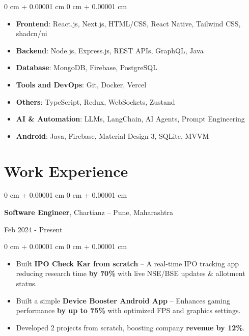 \documentclass[10pt, letterpaper]{article}
\newenvironment{highlights}{
    \begin{itemize}[
        topsep=0.10 cm,
        parsep=0.10 cm,
        partopsep=0pt,
        itemsep=0pt,
        leftmargin=0 cm + 10pt,
        labelindent=0pt
    ]
}{
    \end{itemize}
} %
\newenvironment{highlightsforbulletentries}{
    \begin{itemize}[
        topsep=0.10 cm,
        parsep=0.10 cm,
        partopsep=0pt,
        itemsep=0pt,
        leftmargin=10pt,
        labelindent=0pt
    ]
}{
    \end{itemize}
} %
\newenvironment{onecolentry}{
    \begin{adjustwidth}{
        0 cm + 0.00001 cm
    }{
        0 cm + 0.00001 cm
    }
}{
    \end{adjustwidth}
} %
\newenvironment{twocolentry}[2][]{
    \onecolentry
    \def\secondColumn{#2}
    \setcolumnwidth{\fill, 4.5 cm}
    \begin{paracol}{2}
}{
    \switchcolumn \raggedleft \secondColumn
    \end{paracol}
    \endonecolentry
} %
\begin{document}
    \begin{onecolentry}
        \begin{highlightsforbulletentries}

            \item \textbf{Frontend}: React.js, Next.js, HTML/CSS, React Native, Tailwind CSS, shadcn/ui
            \item \textbf{Backend}: Node.js, Express.js, REST APIs, GraphQL, Java
            \item \textbf{Database}: MongoDB, Firebase, PostgreSQL
            \item \textbf{Tools and DevOps}: Git, Docker, Vercel
            \item \textbf{Others}: TypeScript, Redux, WebSockets, Zustand
            \item \textbf{AI \& Automation}: LLMs, LangChain, AI Agents, Prompt Engineering
            \item \textbf{Android}: Java, Firebase, Material Design 3, SQLite, MVVM

        \end{highlightsforbulletentries}
    \end{onecolentry}

    \section{Work Experience}

        \begin{twocolentry}{Feb 2024 - Present}
            \textbf{Software Engineer}, Chartianz -- Pune, Maharashtra
        \end{twocolentry}

        \vspace{0.10 cm}
        \begin{onecolentry}
            \begin{highlights}
                \item Built \textbf{IPO Check Kar from scratch} – A real-time IPO tracking app reducing research time \textbf{by 70\%} with live NSE/BSE updates \& allotment status.
                \item Built a simple \textbf{Device Booster Android App} – Enhances gaming performance \textbf{by up to 75\%} with optimized FPS and graphics settings.
                \item Developed 2 projects from scratch, boosting company \textbf{revenue by 12\%}.
            \end{highlights}
        \end{onecolentry}
\end{document}
